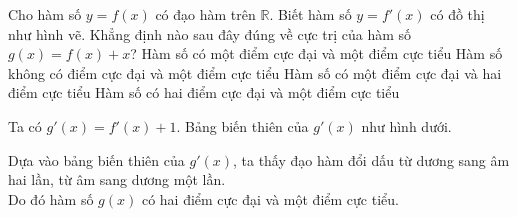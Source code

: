 \begin{ex}%
    \immini
    {
        Cho hàm số $y=f(x)$ có đạo hàm trên $\mathbb{R}$. Biết hàm số $y=f'(x)$ có đồ thị như hình vẽ. Khẳng định nào sau đây đúng về cực trị của hàm số $g(x)=f(x)+x$?
        \choice
        {Hàm số có một điểm cực đại và một điểm cực tiểu}
        {Hàm số không có điểm cực đại và một điểm cực tiểu}
        {Hàm số có một điểm cực đại và hai điểm cực tiểu}
        {\True Hàm số có hai điểm cực đại và một điểm cực tiểu}
    }
    {
    }
    \loigiai
    {
        Ta có $g'(x)=f'(x)+1$. Bảng biến thiên của $g'(x)$ như hình dưới.
        \begin{center}
        \end{center}
        Dựa vào bảng biến thiên của $g'(x)$, ta thấy đạo hàm đổi dấu từ dương sang âm hai lần, từ âm sang dương một lần.\\
        Do đó hàm số $g(x)$ có hai điểm cực đại và một điểm cực tiểu.
    }
\end{ex}
